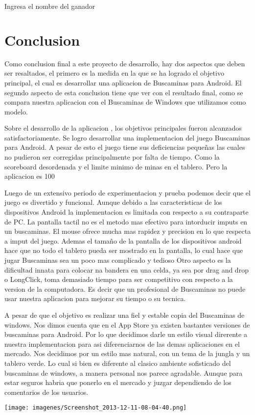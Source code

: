 \documentclass[11pt]{article} %
\begin{document}
\begin{center}
Ingresa el nombre del ganador


\section{Conclusion}

Como conclusion final a este proyecto de desarrollo, hay dos aspectos que deben ser resaltados, el primero es la medida en la que se ha logrado el objetivo principal, el cual es desarrollar una aplicacion de Buscaminas para Android. 
El segundo aspecto de esta conclusion tiene que ver con el resultado final, como se compara nuestra aplicacion con el Buscaminas de Windows que utilizamos como modelo. 

Sobre el desarrollo de la aplicacion , los objetivos principales fueron alcanzados satisfactoriamente. Se logro desarrollar una implementacion del juego Buscaminas para Android. 
A pesar de esto el juego tiene sus deficiencias pequeñas las cuales no pudieron ser corregidas principalmente por falta de tiempo. Como la scoreboard desordenada y el limite minimo de minas en el tablero.
Pero la aplicacion es 100%

Luego de un extensivo periodo de experimentacion y prueba podemos decir que el juego es divertido y funcional. 
Aunque debido a las caracteristicas de los dispositivos Android la implementacion es limitada con respecto a su contraparte de PC.
La pantalla tactil no es el metodo mas efectivo para intorducir imputs en un buscaminas. El mouse ofrece mucha mas rapidez y precision en lo que respecta a imput del juego.
Ademas el tamaño de la pantalla de los dispositivos android hace que no todo el tablero pueda ser mostrado en la pantalla, lo cual hace que jugar Buscaminas sea un poco mas complicado y tedioso
Otro aspecto es la dificultad innata para colocar na bandera en una celda, ya sea por drag and drop o LongClick, toma demasiado tiempo para ser competitivo con respecto a la version de la computadora. Es decir que un profesional de Buscaminas no puede usar nuestra aplicacion para mejorar su tiempo o su tecnica.

A pesar de que el objetivo es realizar una fiel y estable copia del Buscaminas de windows. Nos dimos cuenta que en el App Store ya existen bastantes versiones de buscaminas para Android. Por lo que decidimos darle un estilo visual direrente a nuestra implementacion para asi diferenciarnos de las demas aplicaciones en el mercado. Nos decidimos por un estilo mas natural, con un tema de la jungla y un tablero verde. Lo cual si bien es diferente al clasico ambiente sofisticado del buscaminas de windows, a manera personal nos parece agradable. Aunque para estar seguros habria que ponerlo en el mercado y juzgar dependiendo de los comentarios de los usuarios.




\texttt{[image: imagenes/Screenshot\_2013-12-11-08-04-40.png]}
\end{center}
\end{document}

